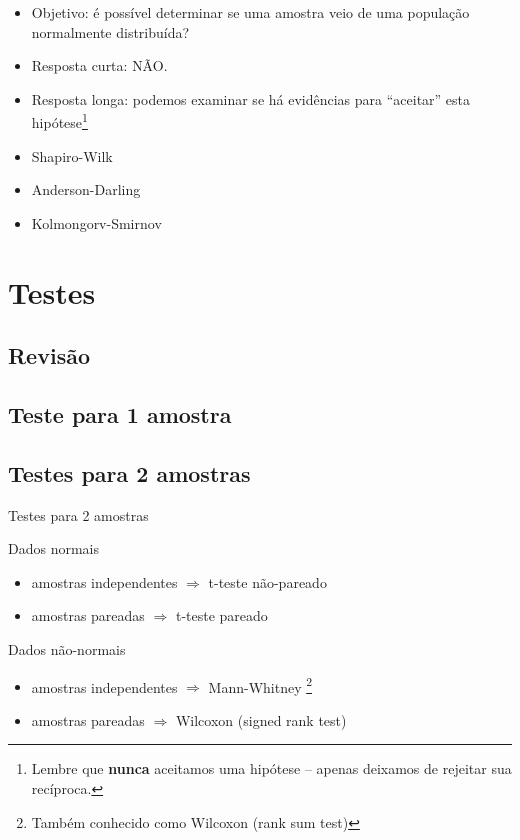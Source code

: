 \documentclass{beamer}
\begin{document}
\begin{frame}
  \begin{itemize}
  \item Objetivo: é possível \alert{determinar} se uma amostra veio de uma população normalmente distribuída?
  \item Resposta curta: \alert<3->{NÃO}.
  \item<4> Resposta longa: podemos examinar se há evidências para ``aceitar'' esta hipótese\footnote{Lembre que {\bf nunca} aceitamos uma hipótese -- apenas deixamos de rejeitar sua recíproca.}
  \end{itemize}
\end{frame}

\begin{frame}
  \begin{itemize}
  \item Shapiro-Wilk
  \item Anderson-Darling
  \item Kolmongorv-Smirnov
  \end{itemize}
\end{frame}

\section{Testes}

\subsection{Revisão}

\subsection[1 amostra]{Teste para 1 amostra}

\subsection[2 médias]{Testes para 2 amostras}

\begin{frame}{Testes para 2 amostras}
  \begin{block}{Dados normais}
    \begin{itemize}
    \item amostras independentes $\Rightarrow$ t-teste não-pareado
    \item amostras pareadas $\Rightarrow$ t-teste pareado
    \end{itemize}
  \end{block}
  \begin{block}{Dados não-normais}
    \begin{itemize}
    \item amostras independentes $\Rightarrow$ Mann-Whitney \footnote{Também conhecido como Wilcoxon (rank sum test)}
    \item amostras pareadas $\Rightarrow$ Wilcoxon (signed rank test)
    \end{itemize}
  \end{block}
\end{frame}
\end{document}
